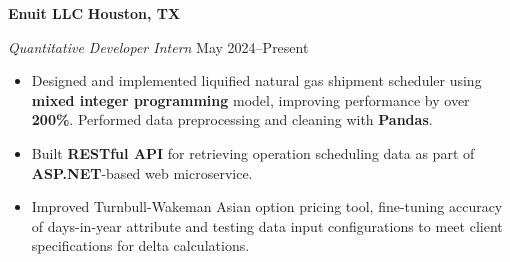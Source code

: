 \textbf{Enuit LLC} \hfill \textbf{Houston, TX}\par
\textit{Quantitative Developer Intern} \hfill May 2024--Present

\begin{itemize}
	\item Designed and implemented liquified natural gas shipment scheduler using \textbf{mixed integer programming} model, improving performance by over \textbf{200\%}. Performed data preprocessing and cleaning with \textbf{Pandas}.
	\item Built \textbf{RESTful API} for retrieving operation scheduling data as part of \textbf{ASP.NET}-based web microservice.
	\item Improved Turnbull-Wakeman Asian option pricing tool, fine-tuning accuracy of days-in-year attribute and testing data input configurations to meet client specifications for delta calculations.
\end{itemize}\par


